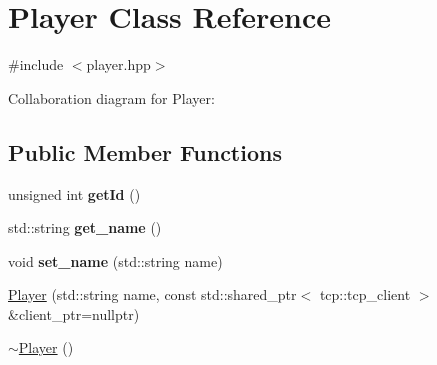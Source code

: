 \hypertarget{classPlayer}{}\section{Player Class Reference}
\label{classPlayer}


{\ttfamily \#include $<$player.\+hpp$>$}



Collaboration diagram for Player\+:
\subsection*{Public Member Functions}
\begin{DoxyCompactItemize}
\item 
unsigned int {\bfseries get\+Id} ()\hypertarget{classPlayer_aefc3db8fc54fab638b25764a4c37f078}{}\label{classPlayer_aefc3db8fc54fab638b25764a4c37f078}

\item 
std\+::string {\bfseries get\+\_\+name} ()\hypertarget{classPlayer_a788340fc5f21143f47eed04f6fd79976}{}\label{classPlayer_a788340fc5f21143f47eed04f6fd79976}

\item 
void {\bfseries set\+\_\+name} (std\+::string name)\hypertarget{classPlayer_a318d379b56621caf571b97b54965b2e9}{}\label{classPlayer_a318d379b56621caf571b97b54965b2e9}

\item 
\hyperlink{classPlayer_a11226c6f07703e035c6a774ac96fce09}{Player} (std\+::string name, const std\+::shared\+\_\+ptr$<$ tcp\+::tcp\+\_\+client $>$ \&client\+\_\+ptr=nullptr)
\item 
\hyperlink{classPlayer_a749d2c00e1fe0f5c2746f7505a58c062}{$\sim$\+Player} ()
\end{DoxyCompactItemize}
